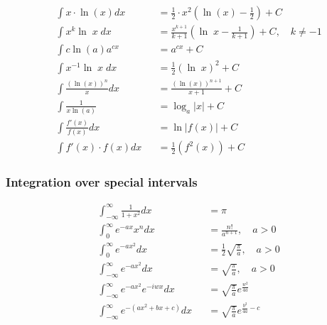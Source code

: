 \begin{footnotesize}
\begin{align*}
         & \int x \cdot \ln(x) dx                &  & =\frac 1 2 \cdot x^2(\ln(x)-\frac{1}{2})+C                                        \\
         & \int x^k \ln\; x \;dx                 &  & =\frac{x^{k+1}}{k+1}\left(\ln\; x-\frac{1}{k+1}\right)+C,\quad k\neq -1           \\
         & \int c\ln(a)a^{cx}                    &  & = a^{cx} + C                                                                      \\
         & \int x^{-1}\ln\; x \; dx              &  & =\frac{1}{2}{(\ln\; x)}^2+C                                                       \\
         & \int \frac{{(\ln(x))}^n}{x}dx         &  & =\frac{{(\ln(x))}^{n+1}}{x+1}+C                                                   \\
         & \int \frac{1}{x\ln(a)}                &  & = \log_a|x| +C                                                                    \\
         & \int \frac{f'(x)}{f(x)}dx             &  & =\ln\vert f(x) \vert +C                                                           \\
         & \int f'(x) \cdot f(x) dx              &  & = \frac{1}{2}(f^2(x))+C
    \end{align*}
\end{footnotesize}

\subsubsection{Integration over special intervals}
\begin{align*}
     & \int_{-\infty}^{\infty}\frac{1}{1+x^2}dx    &  & = \pi                                      \\
     & \int_0^{\infty} e^{-ax}x^n dx               &  & =\frac{n!}{a^{n+1}},\quad a>0              \\
     & \int_0^{\infty} e^{-ax^2} dx                &  & =\frac{1}{2}\sqrt{\frac{\pi}{a}},\quad a>0 \\
     & \int_{-\infty}^{\infty} e^{-ax^2} dx        &  & =\sqrt{\frac{\pi}{a}},\quad a>0            \\
     & \int_{-\infty}^{\infty}e^{-ax^2}e^{-iwx} dx &  & = \sqrt{\frac{\pi}{a}}e^{\frac{w^2}{4a}}   \\
     & \int_{-\infty}^{\infty}e^{-(ax^2+bx+c)}dx   &  & = \sqrt{\frac{\pi}{a}}e^{\frac{b^2}{4a}-c} \\
\end{align*}

